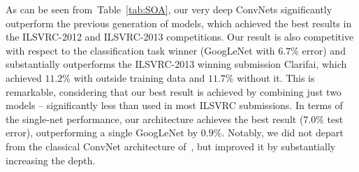 \documentclass{article} %
\newcommand{\tblref}[1]{Table~\ref{#1}}
\begin{document}
As can be seen from~\tblref{tab:SOA}, our very deep \mbox{ConvNets} significantly outperform the previous generation of models, which achieved the best results
in the ILSVRC-2012 and ILSVRC-2013 competitions. Our result is also competitive with respect to the classification task winner (GoogLeNet with $6.7\%$ error) and substantially
outperforms the ILSVRC-2013 winning submission Clarifai, which achieved $11.2\%$ with outside training data and $11.7\%$ without it.
This is remarkable, considering that our best result is achieved by combining just two models -- significantly less than used in most ILSVRC submissions. 
In terms of the single-net performance, our architecture achieves the best result ($7.0\%$ test error), outperforming a single GoogLeNet by $0.9\%$.
Notably, we did not depart from the classical ConvNet architecture of~\citet{LeCun89}, but improved it by substantially increasing the depth.

\vspace{-1em}
\end{document}
